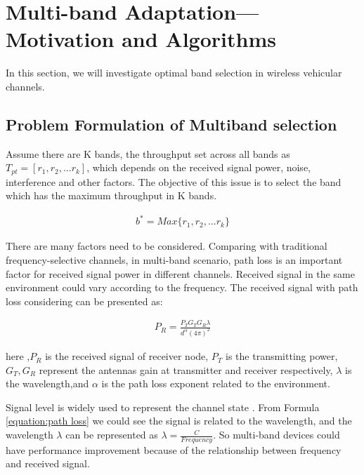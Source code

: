 \section{Multi-band Adaptation---Motivation and Algorithms}
\label{sec:model}

In this section, we will investigate optimal band selection in wireless vehicular channels. 

\subsection{Problem Formulation of Multiband selection}
\label{subsec:problem}
Assume there are K bands, the throughput set across all bands as $T_{pt}=[r_1,r_2,...r_k]$, which depends on the received signal power, noise, interference and other factors. 
The objective of this issue is to select the band which has the maximum throughput in K bands. 

\begin{align}
\label{equation:max}
b^*=Max\{r_1,r_2,...r_k\}
\end{align}

There are many factors need to be considered.
Comparing with traditional frequency-selective channels, in multi-band scenario, path loss is an important factor for received signal power in different channels. 
Received signal in the same environment could vary according to the frequency.
The received signal with path loss considering can be presented as:\cite{rappaport}

\begin{align}
\label{equation:path loss}
P_{R}=\frac{P_TG_TG_R\lambda}{d^\alpha(4\pi)^2}
\end{align}

here ,$P_R$ is the received signal of receiver node, $P_T$ is the transmitting power, $G_T,G_R$ represent the antennas gain at transmitter and receiver respectively,
	  $\lambda$ is the wavelength,and $\alpha$ is the path loss exponent related to the environment. 

	  Signal level is widely used to represent the channel state  \cite{rahul2009frequency}. 
	  From Formula \ref{equation:path loss} we could see the signal is related to the wavelength, and the wavelength $\lambda$ can be represented as $\lambda=\frac{C}{Frequency}$. So multi-band devices could have performance improvement because of the relationship between frequency and received signal.


